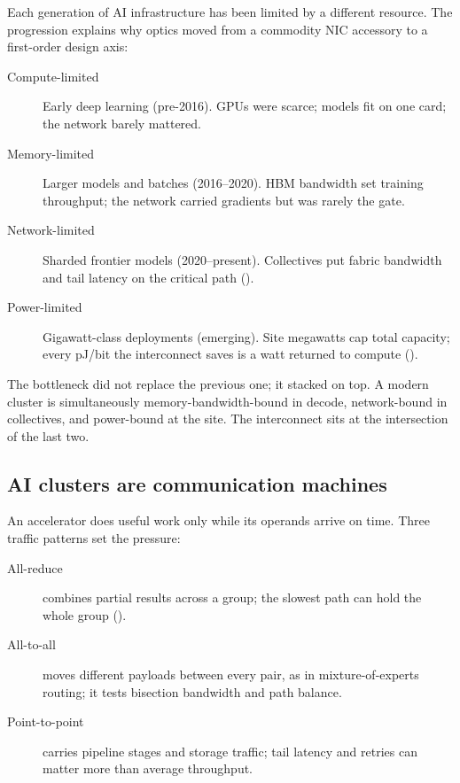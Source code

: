 Each generation of AI infrastructure has been limited by a different resource.
The progression explains why optics moved from a commodity NIC accessory to a
first-order design axis:

\begin{description}
\item[Compute-limited] Early deep learning (pre-2016). GPUs were scarce; models
      fit on one card; the network barely mattered.
\item[Memory-limited] Larger models and batches (2016--2020). HBM bandwidth set
      training throughput; the network carried gradients but was rarely the gate.
\item[Network-limited] Sharded frontier models (2020--present). Collectives put
      fabric bandwidth and tail latency on the critical path
      ().
\item[Power-limited] Gigawatt-class deployments (emerging). Site megawatts cap
      total capacity; every pJ/bit the interconnect saves is a watt returned to
      compute ().
\end{description}

The bottleneck did not replace the previous one; it stacked on top. A modern
cluster is simultaneously memory-bandwidth-bound in decode, network-bound in
collectives, and power-bound at the site. The interconnect sits at the
intersection of the last two.

\subsection{AI clusters are communication machines}
\label{sec:communication-machines}

An accelerator does useful work only while its operands arrive on time. Three
traffic patterns set the pressure:

\begin{description}
\item[All-reduce] combines partial results across a group; the slowest path can
      hold the whole group ().
\item[All-to-all] moves different payloads between every pair, as in
      mixture-of-experts routing; it tests bisection bandwidth and path balance.
\item[Point-to-point] carries pipeline stages and storage traffic; tail latency
      and retries can matter more than average throughput.
\end{description}

